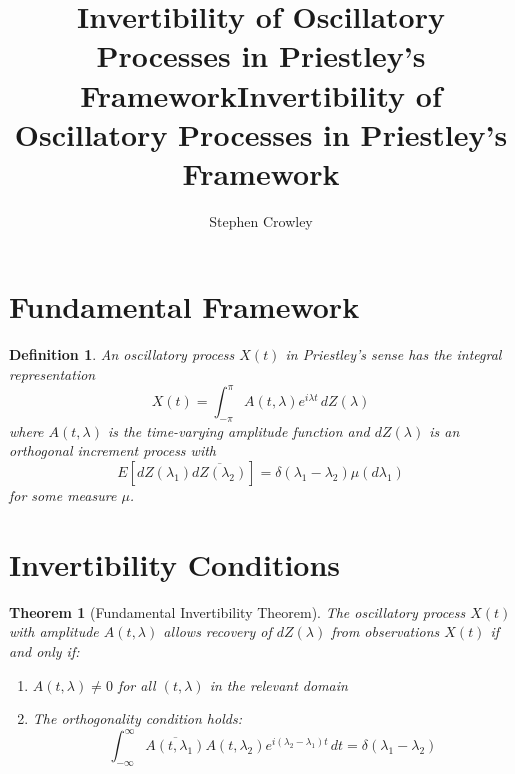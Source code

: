 \documentclass{article}
\title{Invertibility of Oscillatory Processes in Priestley's Framework}
\author{Stephen Crowley}\documentclass{article}
\title{Invertibility of Oscillatory Processes in Priestley's Framework}
\author{}
\date{}
\newtheorem{theorem}{Theorem}
\newtheorem{definition}{Definition}
\newtheorem{theorem}{Theorem}
\newtheorem{definition}{Definition}
\begin{document}
\maketitle

\section{Fundamental Framework}

\begin{definition}
An oscillatory process $X(t)$ in Priestley's sense has the integral representation
\begin{equation}
X(t) = \int_{-\pi}^{\pi} A(t,\lambda) e^{i\lambda t} \, dZ(\lambda)
\end{equation}
where $A(t,\lambda)$ is the time-varying amplitude function and $dZ(\lambda)$ is an orthogonal increment process with
\begin{equation}
E[dZ(\lambda_1) \overline{dZ(\lambda_2)}] = \delta(\lambda_1 - \lambda_2) \mu(d\lambda_1)
\end{equation}
for some measure $\mu$.
\end{definition}

\section{Invertibility Conditions}

\begin{theorem}[Fundamental Invertibility Theorem]
The oscillatory process $X(t)$ with amplitude $A(t,\lambda)$ allows recovery of $dZ(\lambda)$ from observations $X(t)$ if and only if:
\begin{enumerate}
\item $A(t,\lambda) \neq 0$ for all $(t,\lambda)$ in the relevant domain
\item The orthogonality condition holds:
\begin{equation}
\int_{-\infty}^{\infty} \overline{A(t,\lambda_1)} A(t,\lambda_2) e^{i(\lambda_2-\lambda_1)t} \, dt = \delta(\lambda_1 - \lambda_2)
\end{equation}
\end{enumerate}
\end{theorem}
\end{document}

